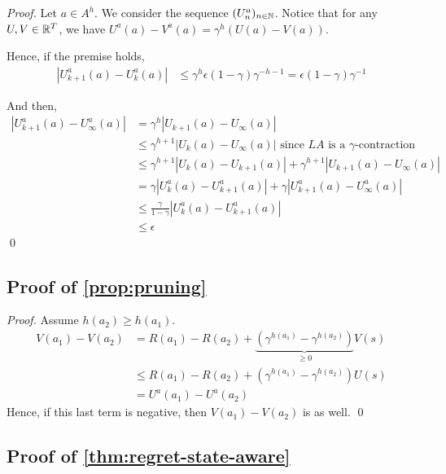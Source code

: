 \documentclass[runningheads]{llncs}
\begin{document}
\begin{proof}
Let $a\in A^h$. We consider the sequence $(U^a_n)_{n\in\mathbb{N}}$.
Notice that for any $U,V\in\mathbb{R}^T$, we have $U^a(a)-V^a(a)=\gamma^h(U(a)-V(a))$.

Hence, if the premise holds,
\begin{align*}
    |U^a_{k+1}(a) - U^a_{k}(a)| &\leq \gamma^h\epsilon (1-\gamma)\gamma^{-h-1} = \epsilon (1-\gamma)\gamma^{-1}
\end{align*}

And then,
\begin{align*}
|U^a_{k+1}(a) - U^a_\infty(a)| &= \gamma^h |U_{k+1}(a) - U_\infty(a)|\\
&\leq \gamma^{h+1}|U_{k}(a) - U_\infty(a)| \text{ since $LA$ is a $\gamma$-contraction}\\
&\leq \gamma^{h+1}|U_{k}(a) - U_{k+1}(a)| + \gamma^{h+1}|U_{k+1}(a) - U_\infty(a)|\\
&= \gamma|U^a_{k}(a) - U^a_{k+1}(a)| + \gamma |U^a_{k+1}(a) - U^a_\infty(a)|\\
&\leq \frac{\gamma}{1-\gamma} |U^a_{k}(a) - U^a_{k+1}(a)|\\
&\leq\epsilon
\end{align*}
\qed\end{proof}

\subsection{Proof of \autoref{prop:pruning}}

\begin{proof}
Assume $h(a_2) \geq h(a_1)$.
\begin{align*}
    V(a_1) - V(a_2) &= R(a_1)- R(a_2) + \underbrace{\left(\gamma^{h(a_1)} - \gamma^{h(a_2)}\right)}_{\geq 0}V(s) \\
    &\leq R(a_1)- R(a_2) + \left(\gamma^{h(a_1)} - \gamma^{h(a_2)}\right)U(s)\\
    &= U^a(a_1) - U^a(a_2)
\end{align*}
Hence, if this last term is negative, then $V(a_1) - V(a_2)$ is as well.
\qed\end{proof}

\subsection{Proof of \autoref{thm:regret-state-aware}}
\end{document}
